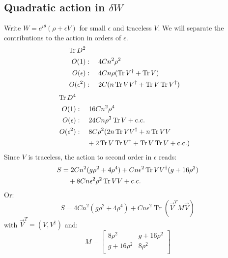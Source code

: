 \documentclass[12pt,a4paper]{article}
\DeclareMathOperator{\Tr}{Tr}
\newcommand{\eit}{e^{i \theta}}
\begin{document}
\subsection{Quadratic action in $\delta W$}
Write $W = \eit(\rho + \epsilon V)$ for small $\epsilon$ and traceless $V$. We will separate the contributions to the action in orders of $\epsilon$.
\begin{align}
\Tr D^2 \notag \\
O(1)&: \quad 4Cn^2 \rho^2 \\
O(\epsilon)&: \quad 4Cn \rho ( \Tr V^\dagger + \Tr V) \\
O(\epsilon^2)&: \quad 2C (n \Tr V V^\dagger + \Tr V \Tr V^\dagger)
\end{align}
\begin{align}
\Tr D^4 \notag \\
O(1)&: \quad 16Cn^2 \rho^4 \\
O(\epsilon)&: \quad 24 C n \rho^3 \Tr V + \text{c.c.} \\
O(\epsilon^2)&: \quad 8C\rho^2(2n \Tr V V^\dagger + n \Tr V V \\
&\phantom{:\quad \ }+2 \Tr V \Tr V^\dagger + \Tr V \Tr V + \text{c.c.}) \notag 
\end{align}
Since $V$ is traceless, the action to second order in $\epsilon$ reads:
\begin{align}
S &= 2Cn^2(g \rho^2 + 4\rho^4) + Cn \epsilon^2 \Tr V V^\dagger (g + 16 \rho^2) \notag \\
&\phantom{\quad}+ 8Cn \epsilon^2 \rho^2 \Tr V V + \text{c.c.}
\end{align}
Or:
\begin{equation}
S = 4Cn^2(g \rho^2 + 4 \rho^4) + Cn \epsilon^2 \Tr(\vec{V}^T M \vec{V}) 
\end{equation}
with $\vec{V}^T = (V, V^\dagger)$ and:
\begin{equation}
M = \begin{bmatrix}
    8 \rho^2 & g + 16 \rho^2 \\
    g + 16 \rho^2 & 8 \rho^2 \\
\end{bmatrix}
\end{equation}
\end{document}
